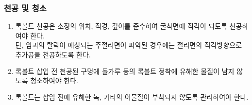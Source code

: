 \documentclass[12pt,a4paper]{article}
\begin{document}
\subsubsection{  천공 및 청소}
\begin{enumerate}
\item  록볼트 천공은 소정의 위치, 직경, 깊이를 준수하여 굴착면에 직각이 되도록 천공하여야 한다. 
       \\ 단, 암괴의 탈락이 예상되는 주절리면이 파악된 경우에는 절리면의 직각방향으로 추가공을 천공하도록 한다.  
\item  록볼트 삽입 전 천공된 구멍에 돌가루 등의 록볼트 정착에 유해한 물질이 남지 않도록 청소하여야 한다.  
\item  록볼트는 삽입 전에 유해한 녹, 기타의 이물질이 부착되지 않도록 관리하여야 한다.  
\end{enumerate}
\end{document}
